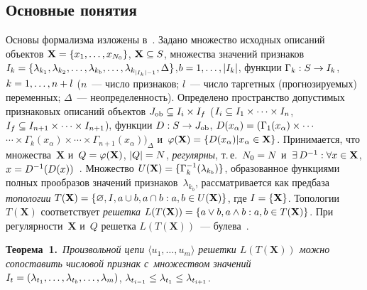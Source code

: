\begin{multicols}{2}
\vspace*{-6pt}
     
\section{Основные понятия}

     Основы формализма изложены в~\cite{2-tor, 5-tor}. Задано множество 
ис\-ход\-ных описаний объектов $\mathbf{X}\hm= \{x_1, \ldots , x_{N_0}\}$, 
$\mathbf{X}\hm\subseteq {S}$, множества значений признаков $I_k\hm= \{ 
\lambda_{k_1}, \lambda_{k_2}, \ldots , \lambda_{k_b}, \ldots , 
\lambda_{k_{\vert I_k\vert -1}}, \Delta\}$,\linebreak $b\hm= 1,\ldots , \vert I_k\vert$, 
функции $\Gamma_k: S \hm\to I_k$, $k\hm=1,\ldots ,n \hm+l$\linebreak 
 ($n$~--- чис\-ло признаков; $l$~--- чис\-ло таргетных (про\-гно\-зи\-ру\-емых) 
переменных; $\Delta$~--- не\-опре\-де\-лен\-ность). Определено пространство 
до\-пус\-ти\-мых при\-зна\-ко\-вых описаний объектов 
$J_{\mathrm{ob}}\hm\subseteq I_i\times I_f$ ($I_i\hm\subseteq I_1\times 
\cdots\times I_n$, $I_f\hm\subseteq I_{n+1} \times\cdots\times I_{n+1}$), 
функции $D: S\hm\to J_{\mathrm{ob}}$, $D(x_\alpha)\hm=(\Gamma_1(x_\alpha)\times \cdots$\linebreak $\cdots\times 
\Gamma_k (x_\alpha)\times\cdots\times \Gamma_{n+1}(x_\alpha))_\Delta$ 
и~$\varphi(\mathbf{X}) \hm= \{ D(x_\alpha)\vert x_\alpha \hm\in \mathbf{X}\}$. 
Принимается, что множества~$\mathbf{X}$ и~$Q\hm= \varphi(\mathbf{X})$, 
$\vert Q\vert \hm= N$, \textit{регулярны}, т.\,е.\ $N_0\hm= N$ и~$\exists\,  
D^{-1}: \forall x\hm\in \mathbf{X}$, $x\hm= D^{-1}(D(x))$~\cite{5-tor}. 
Множество $U(\mathbf{X})\hm=\{\Gamma_k^{-1}(\lambda_{k_b})\}$, 
образованное функциями пол\-ных прообразов значений 
при\-зна\-ков~$\lambda_{k_b}$, рас\-смат\-ри\-ва\-ет\-ся как пред\-ба\-за 
\textit{топологии} $T(\mathbf{X})\hm=\{\varnothing, I, a\cup b, a\cap b: a,b 
\hm\in U(\mathbf{X})\}$, где $I\hm=\{\mathbf{X}\}$. 
Топологии~$T(\mathbf{X})$ соответствует \textit{решетка} 
$L(T(\mathbf{X}))\hm=\{a\vee b, a\wedge b: a,b\hm\in T(\mathbf{X})\}$. При 
ре\-гу\-ляр\-ности~$\mathbf{X}$ и~$Q$ ре\-шет\-ка $L(T(\mathbf{X}))$~--- 
булева~\cite{2-tor}.

\smallskip

\noindent
\textbf{Теорема~1.}\ \textit{Произвольной цепи $\langle u_1, \ldots, 
u_m\rangle$ решетки $L(T(\mathbf{X}))$ мож\-но сопоставить чис\-ло\-вой 
при\-знак с~множеством значений} $I_t\hm= (\lambda_{t_1}, \ldots, 
\lambda_{t_b}, \ldots , \lambda_m)$, $\lambda_{t_{i-1}}\hm\leq \lambda_{t_1} 
\hm\leq \lambda_{t_{i+1}}$. 
     

\end{multicols}
